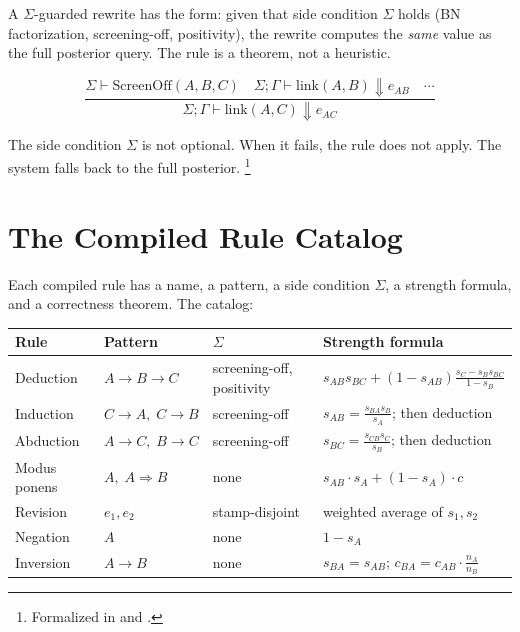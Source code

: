 \documentclass[11pt,openany]{report}
\begin{document}
A $\Sigma$-guarded rewrite has the form: given that side condition
$\Sigma$ holds (BN factorization, screening-off, positivity), the
rewrite computes the \emph{same} value as the full posterior query.
The rule is a theorem, not a heuristic.

\[
\frac{\Sigma \vdash \mathrm{ScreenOff}(A, B, C) \quad
      \Sigma; \Gamma \vdash \mathrm{link}(A, B) \Downarrow e_{AB}
      \quad \cdots}
     {\Sigma; \Gamma \vdash \mathrm{link}(A, C) \Downarrow e_{AC}}
\]

\noindent
The side condition $\Sigma$ is not optional.  When it fails, the
rule does not apply.  The system falls back to the full posterior.%
\footnote{Formalized in
 and
.}

\section{The Compiled Rule Catalog}

Each compiled rule has a name, a pattern, a side condition $\Sigma$,
a strength formula, and a correctness theorem.  The catalog:

\medskip
{\footnotesize
\begin{center}
\begin{tabular}{llll}
\toprule
\textbf{Rule} & \textbf{Pattern} & \textbf{$\Sigma$}
  & \textbf{Strength formula} \\
\midrule
Deduction & $A \!\to\! B \!\to\! C$
  & screening-off, positivity
  & $s_{AB} s_{BC} + (1\!-\!s_{AB})\frac{s_C - s_B s_{BC}}{1 - s_B}$ \\[3pt]
Induction & $C \!\to\! A,\; C \!\to\! B$
  & screening-off
  & $s_{AB} \!=\! \frac{s_{BA} s_B}{s_A}$; then deduction \\[3pt]
Abduction & $A \!\to\! C,\; B \!\to\! C$
  & screening-off
  & $s_{BC} \!=\! \frac{s_{CB} s_C}{s_B}$; then deduction \\[3pt]
Modus ponens & $A,\; A \!\Rightarrow\! B$
  & none
  & $s_{AB} \cdot s_A + (1\!-\!s_A) \cdot c$ \\[3pt]
Revision & $e_1, e_2$
  & stamp-disjoint
  & weighted average of $s_1, s_2$ \\[3pt]
Negation & $A$
  & none
  & $1 - s_A$ \\[3pt]
Inversion & $A \!\to\! B$
  & none
  & $s_{BA} \!=\! s_{AB}$;\; $c_{BA} \!=\! c_{AB} \!\cdot\! \tfrac{n_A}{n_B}$ \\
\bottomrule
\end{tabular}
\end{center}}
\medskip
\end{document}
